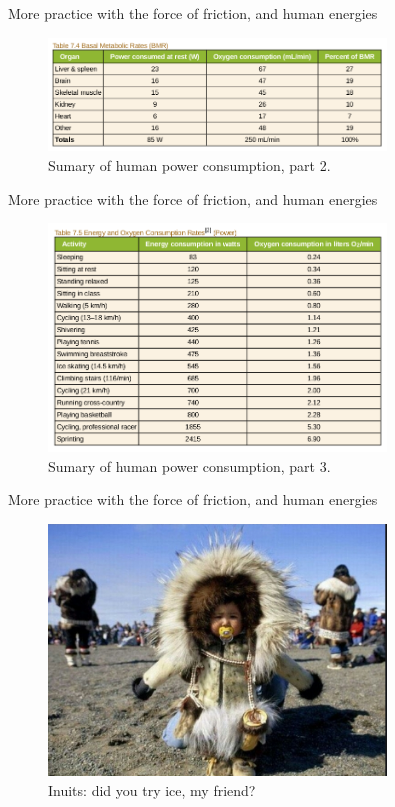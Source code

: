 \documentclass{beamer}
\begin{document}
\begin{frame}{More practice with the force of friction, and human energies}
\begin{figure}
\centering
\includegraphics[width=0.8\textwidth]{human2.png}
\caption{\label{fig:f4} Sumary of human power consumption, part 2.}
\end{figure}
\end{frame}

\begin{frame}{More practice with the force of friction, and human energies}
\begin{figure}
\centering
\includegraphics[width=0.8\textwidth]{human3.png}
\caption{\label{fig:f5} Sumary of human power consumption, part 3.}
\end{figure}
\end{frame}

\begin{frame}{More practice with the force of friction, and human energies}
\begin{figure}
\centering
\includegraphics[width=0.8\textwidth]{inuit.png}
\caption{\label{fig:f6} Inuits: did you try ice, my friend?}
\end{figure}
\end{frame}
\end{document}
